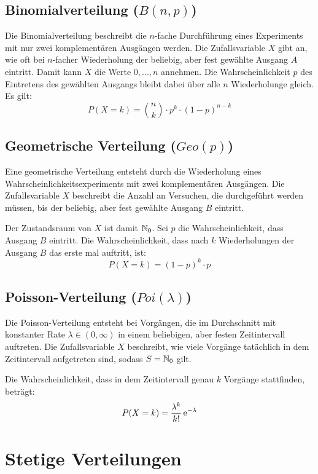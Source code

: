 \subsection{Binomialverteilung ($B(n,p)$)}

Die Binomialverteilung beschreibt die $n$-fache Durchführung eines Experiments
mit nur zwei komplementären Ausgängen werden. Die Zufallsvariable $X$ gibt an,
wie oft bei $n$-facher Wiederholung der beliebig, aber fest gewählte Ausgang $A$
eintritt. Damit kann $X$ die Werte $0, ..., n$ annehmen. Die Wahrscheinlichkeit
$p$ des Eintretens des gewählten Ausgangs bleibt dabei über alle $n$
Wiederholunge gleich. Es gilt:
\[
P(X=k) = \binom{n}{k}\cdot p^k\cdot(1-p)^{n-k}
\]

\subsection{Geometrische Verteilung ($Geo(p)$)}

Eine geometrische Verteilung entsteht durch die Wiederholung eines
Wahrscheinlichkeitsexperiments mit zwei komplementären Ausgängen. Die
Zufallsvariable $X$ beschreibt die Anzahl an Versuchen, die durchgeführt werden
müssen, bis der beliebig, aber fest gewählte Ausgang $B$ eintritt.

Der Zustandsraum von $X$ ist damit $\mathbb{N}_0$. Sei $p$ die Wahrscheinlichkeit, dass
Ausgang $B$ eintritt. Die Wahrscheinlichkeit, dass nach $k$ Wiederholungen der
Ausgang $B$ das erste mal auftritt, ist:
\[
P(X=k) = (1-p)^k\cdot p
\]

\subsection{Poisson-Verteilung ($Poi(\lambda)$)}

Die Poisson-Verteilung entsteht bei Vorgängen, die im Durchschnitt mit
konstanter Rate $\lambda \in (0, \infty)$ in einem beliebigen, aber
festen Zeitintervall auftreten. Die Zufallsvariable $X$ beschreibt, wie viele
Vorgänge tatächlich in dem Zeitintervall aufgetreten sind, sodass $S=\mathbb{N}_0$ gilt.

Die Wahrscheinlichkeit, dass in dem Zeitintervall genau $k$ Vorgänge
stattfinden, beträgt:
\[
P(X=k) = \frac{\lambda^k}{k!}\,\mathrm{e}^{-\lambda}
\]

\section{Stetige Verteilungen}

